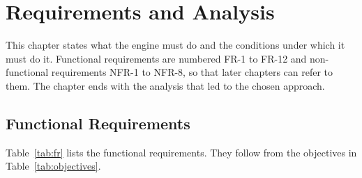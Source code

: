 \clearpage
\chapter{Requirements and Analysis}

This chapter states what the engine must do and the conditions under which it
must do it. Functional requirements are numbered FR-1 to FR-12 and
non-functional requirements NFR-1 to NFR-8, so that later chapters can refer
to them. The chapter ends with the analysis that led to the chosen approach.

\section{Functional Requirements}

Table~\ref{tab:fr} lists the functional requirements. They follow from the
objectives in Table~\ref{tab:objectives}.

